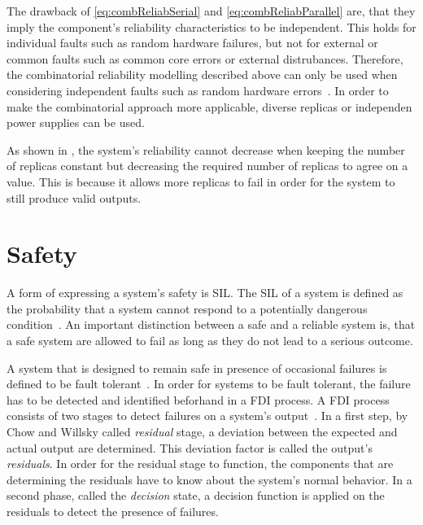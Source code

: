 The drawback of \autoref{eq:combReliabSerial} and \autoref{eq:combReliabParallel} are, that they imply the component's reliability characteristics to be independent.
This holds for individual faults such as random hardware failures, but not for external or common faults such as common core errors or external distrubances.
Therefore, the combinatorial reliability modelling described above can only be used when considering independent faults such as random hardware errors~\cite{BarryFaultToleranceAnalysis}.
In order to make the combinatorial approach more applicable, diverse replicas or independen power supplies can be used.



As shown in , the system's reliability cannot decrease when keeping the number of replicas constant but decreasing the required number of replicas to agree on a value.
This is because it allows more replicas to fail in order for the system to still produce valid outputs.

\section{Safety}
A form of expressing a system's safety is \gls*{SIL}.
The \gls*{SIL} of a system is defined as the probability that a system cannot respond to a potentially dangerous condition~\cite{SallekSIL}.
An important distinction between a safe and a reliable system is, that a safe system are allowed to fail as long as they do not lead to a serious outcome.

A system that is designed to remain safe in presence of occasional failures is defined to be fault tolerant~\cite{RandellFaultTolerance}.
In order for systems to be fault tolerant, the failure has to be detected and identified beforhand in a \gls*{FDI} process.
A \gls*{FDI} process consists of two stages to detect failures on a system's output~\cite{ChowFailureDetectionSystems}.
In a first step, by Chow and Willsky called \textit{residual} stage, a deviation between the expected and actual output are determined.
This deviation factor is called the output's \textit{residuals}.
In order for the residual stage to function, the components that are determining the residuals have to know about the system's normal behavior.
In a second phase, called the \textit{decision} state, a decision function is applied on the residuals to detect the presence of failures.

\fi